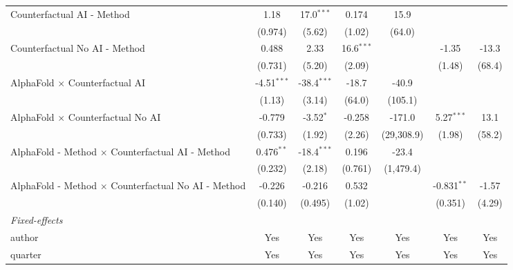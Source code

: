 \begin{tabular}{lcccccc}
   Counterfactual AI - Method                                 & 1.18          & 17.0$^{***}$  & 0.174        & 15.9         &               &   \\   
                                                              & (0.974)       & (5.62)        & (1.02)       & (64.0)       &               &   \\   
   Counterfactual No AI - Method                              & 0.488         & 2.33          & 16.6$^{***}$ &              & -1.35         & -13.3\\   
                                                              & (0.731)       & (5.20)        & (2.09)       &              & (1.48)        & (68.4)\\   
   AlphaFold $\times$ Counterfactual AI                       & -4.51$^{***}$ & -38.4$^{***}$ & -18.7        & -40.9        &               &   \\   
                                                              & (1.13)        & (3.14)        & (64.0)       & (105.1)      &               &   \\   
   AlphaFold $\times$ Counterfactual No AI                    & -0.779        & -3.52$^{*}$   & -0.258       & -171.0       & 5.27$^{***}$  & 13.1\\   
                                                              & (0.733)       & (1.92)        & (2.26)       & (29,308.9)   & (1.98)        & (58.2)\\   
   AlphaFold - Method $\times$ Counterfactual AI - Method     & 0.476$^{**}$  & -18.4$^{***}$ & 0.196        & -23.4        &               &   \\   
                                                              & (0.232)       & (2.18)        & (0.761)      & (1,479.4)    &               &   \\   
   AlphaFold - Method $\times$ Counterfactual No AI - Method  & -0.226        & -0.216        & 0.532        &              & -0.831$^{**}$ & -1.57\\   
                                                              & (0.140)       & (0.495)       & (1.02)       &              & (0.351)       & (4.29)\\   
   \midrule
   \emph{Fixed-effects}\\
   author                                                     & Yes           & Yes           & Yes          & Yes          & Yes           & Yes\\  
   quarter                                                    & Yes           & Yes           & Yes          & Yes          & Yes           & Yes\\  

\end{tabular}

